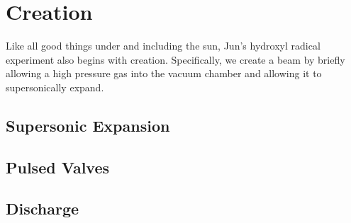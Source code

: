 \ifx\justbeingincluded\undefined


\fi

\chapter{Creation}

Like all good things under and including the sun, Jun's hydroxyl radical experiment also begins with creation. Specifically, we create a beam by briefly allowing a high pressure gas into the vacuum chamber and allowing it to supersonically expand.

\section{Supersonic Expansion}

\section{Pulsed Valves}

\section{Discharge}




\ifx\justbeingincluded\undefined

\fi
